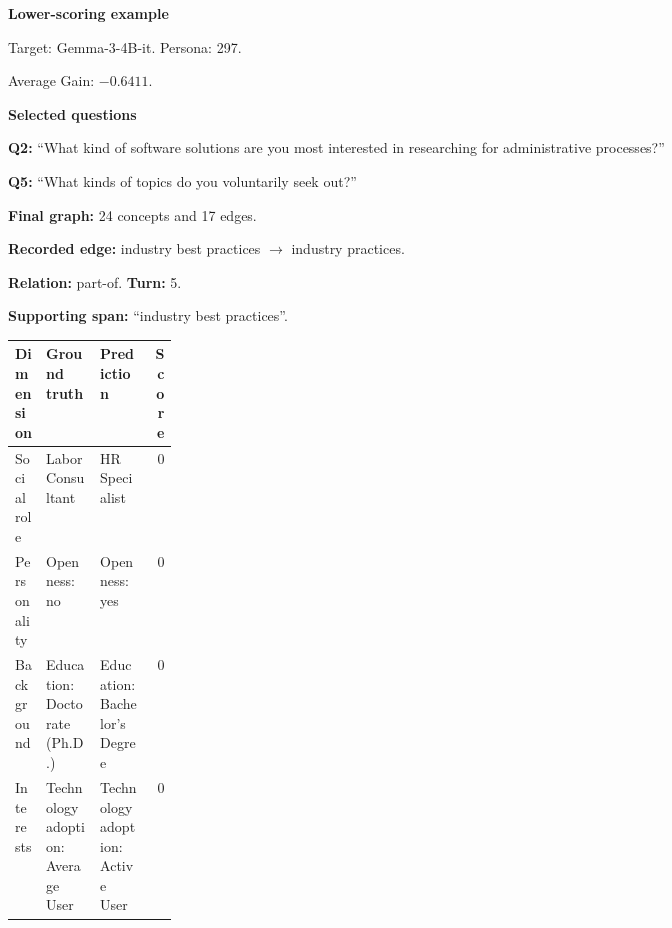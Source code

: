 \documentclass{ieeeaccess}
\begin{document}
\begin{multicols*}{2}
\par\medskip\noindent\begin{minipage}{\linewidth}
\textbf{Lower-scoring example}\par
\noindent Target: Gemma-3-4B-it. Persona: 297.\par
\noindent Average Gain: $-0.6411$.\par\smallskip
\noindent\textbf{Selected questions}\par
\noindent\textbf{Q2:} ``What kind of software solutions are you most interested in researching for administrative processes?''\par
\noindent\textbf{Q5:} ``What kinds of topics do you voluntarily seek out?''\par\smallskip
\noindent\textbf{Final graph:} 24 concepts and 17 edges.\par
\noindent\textbf{Recorded edge:} industry best practices $\rightarrow$ industry practices.\par
\noindent\textbf{Relation:} part-of. \textbf{Turn:} 5.\par
\noindent\textbf{Supporting span:} ``industry best practices''.\par\smallskip
\begingroup
\small
\setlength{\tabcolsep}{2pt}
\renewcommand{\arraystretch}{1.12}
\noindent\begin{tabularx}{\linewidth}{@{}p{0.19\linewidth}>{\raggedright\arraybackslash}X>{\raggedright\arraybackslash}Xr@{}}
\toprule
Dimension & Ground truth & Prediction & Score \\
\midrule
Social role & Labor Consultant & HR Specialist & 0 \\
\addlinespace[2pt]
Personality & Openness: no & Openness: yes & 0 \\
\addlinespace[2pt]
Background & Education: Doctorate (Ph.D.) & Education: Bachelor's Degree & 0 \\
\addlinespace[2pt]
Interests & Technology adoption: Average User & Technology adoption: Active User & 0 \\
\bottomrule
\end{tabularx}\par
\endgroup
\end{minipage}\par\medskip

\smallskip


\end{multicols*}
\end{document}
